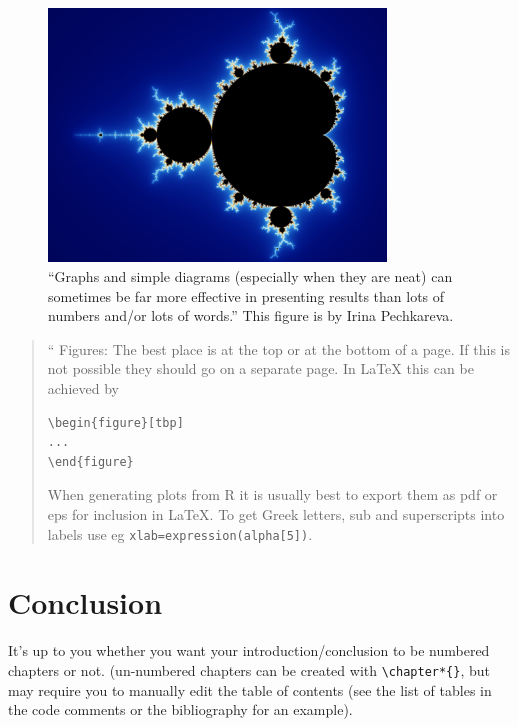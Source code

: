 \documentclass[11pt,a4,twosided,singlespacing,titlepagenumber=on]{scrreprt}
\numberwithin{equation}{chapter} %
\theoremstyle{remark}
\newenvironment{myquote}%
{\begin{quote}{\Large{}``}}%
{\ifhmode\unskip\fi{\Large{}''}\end{quote}}
\begin{document}
\begin{figure}[tbp] %
\centering
\includegraphics[width=0.8\textwidth]{mandelbrot.jpg} %

\caption{``Graphs
and simple diagrams (especially when they are neat) can sometimes be far more effective in presenting results
than lots of numbers and/or lots of words.''
{\small This figure is by Irina Pechkareva.}
\label{fig:mandelbrot}}
\end{figure}
%
\begin{myquote}
Figures: The best place is at the top or at the bottom of a page. If this is not possible they should go
on a separate page. In LaTeX this can be achieved by
\begin{verbatim}
\begin{figure}[tbp]
...
\end{figure}
\end{verbatim}
When generating plots from R it is usually best to export them as pdf or eps for inclusion in LaTeX. To get
Greek letters, sub and superscripts into labels use eg \verb|xlab=expression(alpha[5])|.
\end{myquote}

\chapter{Conclusion}
It's up to you whether you want your introduction/conclusion to be numbered chapters or not. (un-numbered chapters can be created with \verb|\chapter*{}|, but may require you to manually edit the table of contents (see the list of tables in the code comments or the bibliography for an example).
\end{document}
